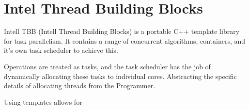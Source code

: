 \section{Intel Thread Building Blocks}

Intell TBB (Intell Thread Building Blocks) is a portable C++ template library for task parallelism.
It contains a range of concurrent algorithms, containers, and it's own task scheduler to achieve this.

Operations are treated as tasks, and the task scheduler has the job of dynamically allocating these tasks 
to individual cores. Abstracting the specific details of allocating threads from the Programmer. 

Using templates allows for 

